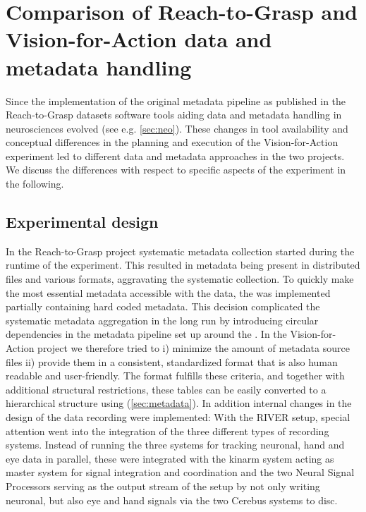 \section{Comparison of Reach-to-Grasp and Vision-for-Action data and metadata handling}
Since the implementation of the original metadata pipeline as published in the Reach-to-Grasp datasets \citep{Brochier_2018} software tools aiding data and metadata handling in neurosciences evolved (see e.g. \cref{sec:neo}). These changes in tool availability and conceptual differences in the planning and execution of the Vision-for-Action experiment led to different data and metadata approaches in the two projects. We discuss the differences with respect to specific aspects of the experiment in the following.

\subsection{Experimental design}
In the Reach-to-Grasp project systematic metadata collection started during the runtime of the experiment. This resulted in metadata being present in distributed files and various formats, aggravating the systematic collection. To quickly make the most essential metadata accessible with the data, the  was implemented partially containing hard coded metadata. This decision complicated the systematic metadata aggregation in the long run by introducing circular dependencies in the metadata pipeline set up around the .
In the Vision-for-Action project we therefore tried to i) minimize the amount of metadata source files ii) provide them in a consistent, standardized format that is also human readable and user-friendly. The  format fulfills these criteria, and together with additional structural restrictions, these tables can be easily converted to a hierarchical  structure using  (\cref{sec:metadata}).
In addition internal changes in the design of the data recording were implemented: With the RIVER setup, special attention went into the integration of the three different types of recording systems. Instead of running the three systems for tracking neuronal, hand and eye data in parallel, these were integrated with the kinarm system acting as master system for signal integration and coordination and the two Neural Signal Processors serving as the output stream of the setup by not only writing neuronal, but also eye and hand signals via the two Cerebus systems to disc.
